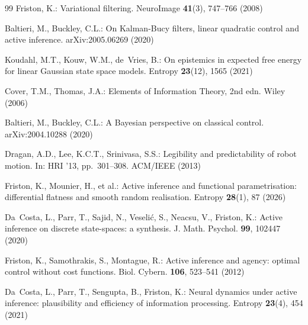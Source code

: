 \documentclass[runningheads]{llncs}
\begin{document}
\begin{thebibliography}{99}
Friston, K.: Variational filtering. NeuroImage \textbf{41}(3), 747--766 (2008)

Baltieri, M., Buckley, C.L.: On Kalman-Bucy filters, linear quadratic control and active inference. arXiv:2005.06269 (2020)

Koudahl, M.T., Kouw, W.M., de~Vries, B.: On epistemics in expected free energy for linear Gaussian state space models. Entropy \textbf{23}(12), 1565 (2021)

Cover, T.M., Thomas, J.A.: Elements of Information Theory, 2nd edn. Wiley (2006)

Baltieri, M., Buckley, C.L.: A Bayesian perspective on classical control. arXiv:2004.10288 (2020)

Dragan, A.D., Lee, K.C.T., Srinivasa, S.S.: Legibility and predictability of robot motion. In: HRI '13, pp.~301--308. ACM/IEEE (2013)

Friston, K., Mounier, H., et al.: Active inference and functional parametrisation: differential flatness and smooth random realisation. Entropy \textbf{28}(1), 87 (2026)

Da~Costa, L., Parr, T., Sajid, N., Veseli\'{c}, S., Neacsu, V., Friston, K.: Active inference on discrete state-spaces: a synthesis. J. Math. Psychol. \textbf{99}, 102447 (2020)

Friston, K., Samothrakis, S., Montague, R.: Active inference and agency: optimal control without cost functions. Biol. Cybern. \textbf{106}, 523--541 (2012)

Da~Costa, L., Parr, T., Sengupta, B., Friston, K.: Neural dynamics under active inference: plausibility and efficiency of information processing. Entropy \textbf{23}(4), 454 (2021)

\end{thebibliography}
\end{document}
